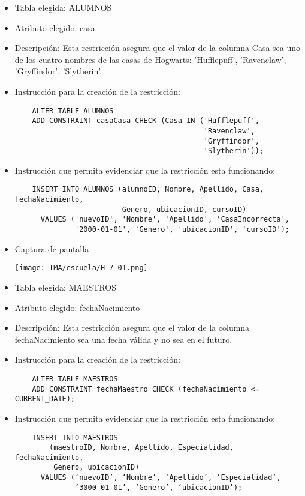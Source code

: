 \begin{itemize} 
  \item Tabla elegida: ALUMNOS 
  \item Atributo elegido: casa 
  \item Descripción: Esta restricción asegura que el valor de la columna Casa sea uno de los cuatro nombres de las casas de Hogwarts: 'Hufflepuff', 'Ravenclaw', 'Gryffindor', 'Slytherin'. 
  \item Instrucción para la creación de la restricción: 
    \begin{verbatim} 
    ALTER TABLE ALUMNOS 
    ADD CONSTRAINT casaCasa CHECK (Casa IN ('Hufflepuff',
                                            'Ravenclaw', 
                                            'Gryffindor', 
                                            'Slytherin')); 
    \end{verbatim} 
  \item Instrucción que permita evidenciar que la restricción esta funcionando: 
    \begin{verbatim} 
    INSERT INTO ALUMNOS (alumnoID, Nombre, Apellido, Casa, fechaNacimiento,
                         Genero, ubicacionID, cursoID) 
      VALUES ('nuevoID', 'Nombre', 'Apellido', 'CasaIncorrecta', 
              '2000-01-01', 'Genero', 'ubicacionID', 'cursoID'); 
    \end{verbatim} 
  \item Captura de pantalla 
    \begin{center} 
      \texttt{[image: IMA/escuela/H-7-01.png]}
    \end{center} 
\end{itemize}

\begin{itemize} 
  \item Tabla elegida: MAESTROS 
  \item Atributo elegido: fechaNacimiento 
  \item Descripción: Esta restricción asegura que el valor de la columna fechaNacimiento sea una fecha válida y no sea en el futuro. 
  \item Instrucción para la creación de la restricción: 
  \begin{verbatim} 
    ALTER TABLE MAESTROS 
    ADD CONSTRAINT fechaMaestro CHECK (fechaNacimiento <= CURRENT_DATE); 
  \end{verbatim} 
  \item Instrucción que permita evidenciar que la restricción esta funcionando: 
  \begin{verbatim} 
    INSERT INTO MAESTROS 
        (maestroID, Nombre, Apellido, Especialidad, fechaNacimiento, 
         Genero, ubicacionID) 
      VALUES (‘nuevoID’, ‘Nombre’, ‘Apellido’, ‘Especialidad’,
              ‘3000-01-01’, ‘Genero’, ‘ubicacionID’); 
  \end{verbatim}   
\end{itemize}

